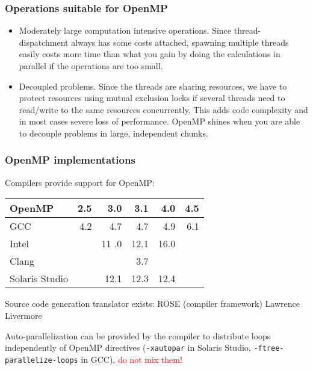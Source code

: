 \begin{frame}
  \frametitle{Operations suitable for OpenMP}
  \begin{itemize}
  \item Moderately large computation intensive operations. Since
    thread-dispatchment always has some costs attached, spawning multiple
    threads easily costs more time than what you gain by doing the calculations
    in parallel if the operations are too small.
  \item Decoupled problems. Since the threads are sharing resources, we have to
    protect resources using mutual exclusion locks if several threads need to
    read/write to the same resources concurrently. This adds code complexity and
    in most cases severe loss of performance. OpenMP shines when you are able to
    decouple problems in large, independent chunks.
  \end{itemize}
\end{frame}

\begin{frame}
\frametitle{OpenMP implementations}

Compilers provide support for OpenMP:\\[2ex]
\begin{center}
\begin{tabular}{l|rrrrr}
OpenMP         & 2.5  & 3.0   & 3.1  &  4.0 & 4.5 \\
\hline\hline
GCC            & 4.2  & 4.7   & 4.7  &  4.9 & 6.1 \\
Intel          &      & 11 .0 & 12.1 & 16.0 &     \\
Clang          &      &       & 3.7  &      &     \\
Solaris Studio &      & 12.1  & 12.3 & 12.4 &     \\    
\end{tabular}
\end{center}

\medskip
Source code generation translator exists: ROSE (compiler framework) Lawrence Livermore

\medskip
Auto-parallelization can be provided by the compiler to distribute loops independently of OpenMP directives (\texttt{-xautopar} in Solaris Studio, \texttt{-ftree-parallelize-loops} in GCC), \textcolor{red}{do not mix them!}

\end{frame}

